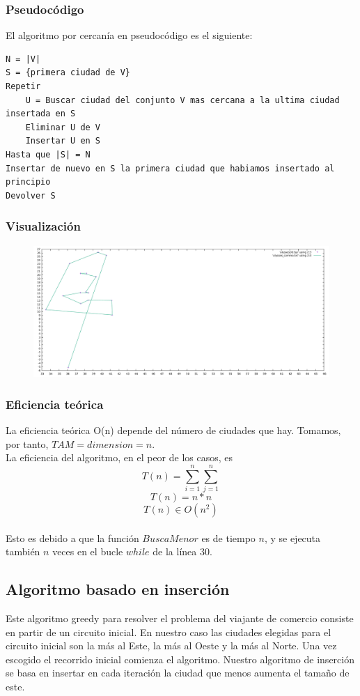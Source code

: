 \documentclass[11pt,a4paper]{article} %
\begin{document}
\subsubsection{Pseudocódigo}
El algoritmo por cercanía en pseudocódigo es el siguiente:
\begin{lstlisting}
N = |V|
S = {primera ciudad de V}
Repetir
	U = Buscar ciudad del conjunto V mas cercana a la ultima ciudad insertada en S
	Eliminar U de V
	Insertar U en S
Hasta que |S| = N
Insertar de nuevo en S la primera ciudad que habiamos insertado al principio
Devolver S
\end{lstlisting}

\subsubsection{Visualización}
\begin{figure}[H]
	\centering
	\includegraphics[width=13cm]{data/graphics/cercania/cercania.pdf}
\end{figure}

\subsubsection{Eficiencia teórica}
La eficiencia teórica O(n) depende del número de ciudades que hay. Tomamos, por tanto, $TAM = dimension = n$.\\

La eficiencia del algoritmo, en el peor de los casos, es 
$$T(n) = \sum_{i=1}^{n}\sum_{j=1}^{n}$$
$$T(n) = n*n$$
$$T(n) \in O(n^2)$$\\

Esto es debido a que la función $BuscaMenor$ es de tiempo $n$, y se ejecuta también $n$ veces en el bucle $while$ de la línea 30.



\newpage
\subsection{Algoritmo basado en inserción}
Este algoritmo greedy para resolver el problema del viajante de comercio consiste en partir de un circuito inicial. En nuestro caso las ciudades elegidas para el circuito inicial son la más al Este, la más al Oeste y la más al Norte. Una vez escogido el recorrido inicial comienza el algoritmo. Nuestro algoritmo de inserción se basa en insertar en cada iteración la ciudad que menos aumenta el tamaño de este.
\end{document}
